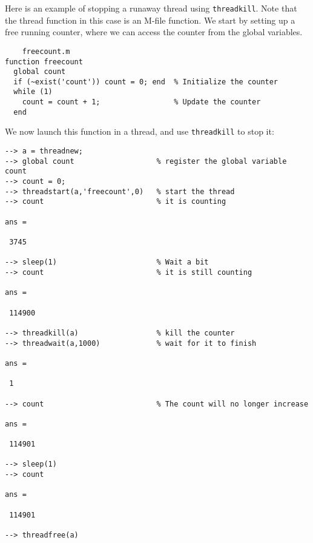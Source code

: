 Here is an example of stopping a runaway thread using \verb|threadkill|.
Note that the thread function in this case is an M-file function.
We start by setting up a free running counter, where we can access 
the counter from the global variables.  
\begin{verbatim}
    freecount.m
function freecount
  global count
  if (~exist('count')) count = 0; end  % Initialize the counter
  while (1)
    count = count + 1;                 % Update the counter
  end
\end{verbatim}
We now launch this function in a thread, and use \verb|threadkill| to
stop it:
\begin{verbatim}
--> a = threadnew;
--> global count                   % register the global variable count
--> count = 0;
--> threadstart(a,'freecount',0)   % start the thread
--> count                          % it is counting

ans = 

 3745 

--> sleep(1)                       % Wait a bit
--> count                          % it is still counting

ans = 

 114900 

--> threadkill(a)                  % kill the counter
--> threadwait(a,1000)             % wait for it to finish

ans = 

 1 

--> count                          % The count will no longer increase

ans = 

 114901 

--> sleep(1)
--> count

ans = 

 114901 

--> threadfree(a)
\end{verbatim}
